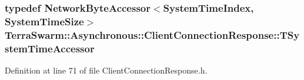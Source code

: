 \hypertarget{class_terra_swarm_1_1_asynchronous_1_1_client_connection_response_a64cb8d4313a5d10fa85b3e0b692764bd}{
\subsubsection[{T\-System\-Time\-Accessor}]{\setlength{\rightskip}{0pt plus 5cm}typedef {\bf Network\-Byte\-Accessor}$<${\bf System\-Time\-Index}, {\bf System\-Time\-Size}$>$ {\bf Terra\-Swarm\-::\-Asynchronous\-::\-Client\-Connection\-Response\-::\-T\-System\-Time\-Accessor}\hspace{0.3cm}{\ttfamily [private]}}}\label{class_terra_swarm_1_1_asynchronous_1_1_client_connection_response_a64cb8d4313a5d10fa85b3e0b692764bd}


Definition at line 71 of file Client\-Connection\-Response.\-h.



